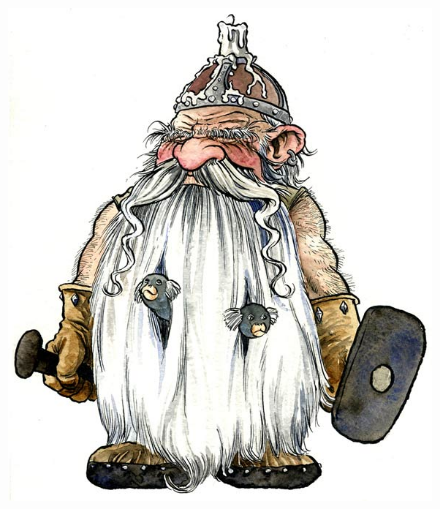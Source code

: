 \documentclass[]{article}
\begin{document}
\newpage
{}
\begin{figure}[h!]
\centering
\includegraphics[scale=.5]{Illustration2}
\end{figure}
\end{document}
